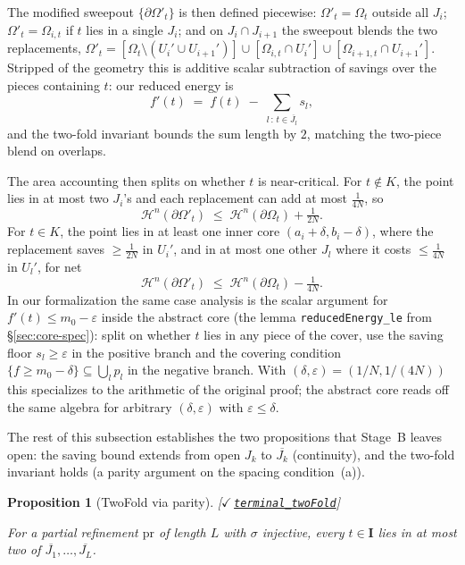 \documentclass[11pt,reqno]{amsart}
\newtheorem{proposition}[theorem]{Proposition}
\theoremstyle{definition}
\newcommand{\unit}{\mathbf{I}}
\newcommand{\leanrepo}{https://github.com/MathNetwork/comb_arg/blob/v0.1.0/CombArg}
\newcommand{\leanmargin}[2]{%
  \nopagebreak\hfill{\normalfont\small\color{leangreen}%
    [\ensuremath{\checkmark}\,\href{\leanrepo/#2}{\texttt{#1}}]}\par\nopagebreak
}
\begin{document}
The modified sweepout $\{\partial \Omega'_t\}$ is then defined
piecewise: $\Omega'_t = \Omega_t$ outside all $J_i$; $\Omega'_t =
\Omega_{i,t}$ if $t$ lies in a single $J_i$; and on
$J_i \cap J_{i+1}$ the sweepout blends the two replacements,
$\Omega'_t = [\Omega_t \setminus (U_i' \cup U_{i+1}')] \cup
[\Omega_{i,t} \cap U_i'] \cup [\Omega_{i+1,t} \cap U_{i+1}']$.
Stripped of the geometry this is additive scalar subtraction of
savings over the pieces containing $t$: our reduced energy is
\[
f'(t) \;=\; f(t) \;-\; \sum_{l \,:\, t \in \overline{J_l}} s_l,
\]
and the two-fold invariant bounds the sum length by $2$, matching
the two-piece blend on overlaps.

The area accounting then splits on whether $t$ is near-critical.
For $t \notin K$, the point lies in at most two $J_i$'s and each
replacement can add at most $\tfrac{1}{4N}$, so
\[
\mathcal{H}^n(\partial \Omega'_t) \;\le\;
\mathcal{H}^n(\partial \Omega_t) + \tfrac{1}{2N}.
\]
For $t \in K$, the point lies in at least one inner core
$(a_i + \delta, b_i - \delta)$, where the replacement saves
$\ge \tfrac{1}{2N}$ in $U_i'$, and in at most one other $J_l$
where it costs $\le \tfrac{1}{4N}$ in $U_l'$, for net
\[
\mathcal{H}^n(\partial \Omega'_t) \;\le\;
\mathcal{H}^n(\partial \Omega_t) - \tfrac{1}{4N}.
\]
In our formalization the same case analysis is the scalar
argument for $f'(t) \le m_0 - \varepsilon$ inside the abstract
core (the lemma \texttt{reducedEnergy\_le} from
\S\ref{sec:core-spec}): split on whether $t$ lies in any piece
of the cover, use the saving floor $s_l \ge \varepsilon$ in the
positive branch and the covering condition
$\{f \ge m_0 - \delta\} \subseteq \bigcup_l p_l$ in the negative
branch. With $(\delta, \varepsilon) = (1/N, 1/(4N))$ this
specializes to the arithmetic of the original proof; the
abstract core reads off the same algebra for arbitrary
$(\delta, \varepsilon)$ with $\varepsilon \le \delta$.

The rest of this subsection establishes the two propositions
that Stage~B leaves open: the saving bound extends from open
$J_k$ to $\overline{J_k}$ (continuity), and the two-fold
invariant holds (a parity argument on the spacing condition~(a)).

\begin{proposition}[TwoFold via parity]
\label{prop:twofold}
\leanmargin{terminal\_twoFold}{Refinement/Assembly.lean}
For a partial refinement $\mathrm{pr}$ of length $L$ with
$\sigma$ injective, every $t \in \unit$ lies in at most two of
$\overline{J_1}, \ldots, \overline{J_L}$.
\end{proposition}
\end{document}
